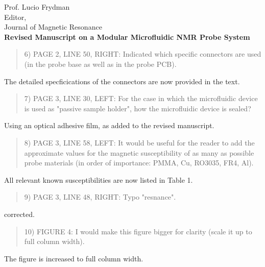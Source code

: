 \documentclass{mu-soton-letter}
\newenvironment{reviewer} {\begin{quote}\color{black!50}} {\end{quote}}
\begin{document}
\begin{letter}{Prof. Lucio Frydman\\
  Editor,\\
  Journal of Magnetic Resonance\\[2cm]
  \textbf{Revised Manuscript on a Modular Microfluidic NMR Probe System}}
\begin{reviewer}
6) PAGE 2, LINE 50, RIGHT: Indicated which specific connectors are used (in the probe base as well as in the probe PCB).
\end{reviewer}
The detailed specficications of the connectors are now provided in the text.

\begin{reviewer}
7) PAGE 3, LINE 30, LEFT: For the case in which the microfluidic device is used as "passive sample holder", how the microfluidic device is sealed?
\end{reviewer}
Using an optical adhesive film, as added to the revised manuscript.

\begin{reviewer}
8) PAGE 3, LINE 58, LEFT: It would be useful for the reader to add the approximate values for the magnetic susceptibility of as many as possible probe materials (in order of importance: PMMA, Cu, RO3035, FR4, Al).
\end{reviewer}
All relevant known susceptibilities are now listed in Table 1.

\begin{reviewer}
9) PAGE 3, LINE 48, RIGHT: Typo "resnance".
\end{reviewer}
corrected.

\begin{reviewer}
10) FIGURE 4: I would make this figure bigger for clarity (scale it up to full column width).
\end{reviewer}
The figure is increased to full column width.


\end{letter}
\end{document}
